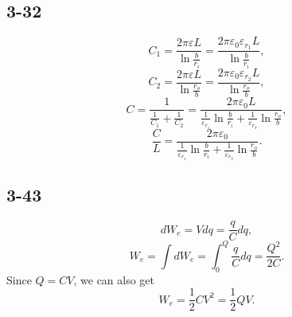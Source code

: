 \documentclass[11pt,a4paper]{article}
\begin{document}
\subsection{3-32}
$$C_1=\frac{2\pi\varepsilon L}{\ln\frac{b}{r_i}}=\frac{2\pi\varepsilon_0\varepsilon_{r_1}L}{\ln\frac{b}{r_i}},$$
$$C_2=\frac{2\pi\varepsilon L}{\ln\frac{r_o}{b}}=\frac{2\pi\varepsilon_0\varepsilon_{r_2}L}{\ln\frac{r_o}{b}},$$
$$C=\frac{1}{\frac{1}{C_1}+\frac{1}{C_2}}=\frac{2\pi\varepsilon_0L}{\frac{1}{\varepsilon_{r_1}}\ln\frac{b}{r_i}+\frac{1}{\varepsilon_{r_3}}\ln\frac{r_o	}{b}},$$
$$\frac{C}{L}=\frac{2\pi\varepsilon_0}{\frac{1}{\varepsilon_{r_1}}\ln\frac{b}{r_i}+\frac{1}{\varepsilon_{r_3}}\ln\frac{r_o}{b}}.$$

\subsection{3-43}
$$dW_e=Vdq=\frac{q}{C}dq,$$
$$W_e=\int dW_e=\int_0^Q \frac{q}{C}dq=\frac{Q^2}{2C}.$$
Since $Q=CV$, we can also get
$$W_e=\frac{1}{2}CV^2=\frac{1}{2}QV.$$
\end{document}
